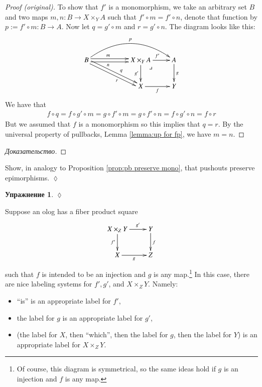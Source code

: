\documentclass[a4paper]{book}
\makeatletter
\def\to{\rightarrow}
\def\taking{\colon}
\def\ullimit{\ar@{}[rd]|(.3)*+{\lrcorner}}
\theoremstyle{myth}
\newtheorem{exampleENG}[envENG]{\begin{english}Example\end{english}}
\newtheorem{excENG}[envENG]{\begin{english}Exercise\end{english}}
\newenvironment{proofENG}{\begin{proof}[Proof (original)]}{\end{proof}}
\newenvironment{exerciseENG}{\begin{excENG}}{\hspace*{\fill}$\lozenge$\end{excENG}}
\newtheorem{excRUS}[envRUS]{Упражнение}
\newenvironment{proofRUS}{\begin{proof}[Доказательство]}{\end{proof}}
\newenvironment{exerciseRUS}{\begin{excRUS}}{\hspace*{\fill}$\lozenge$\end{excRUS}}
\makeatother
\begin{document}
\begin{russian}
\begin{proofENG}
To show that $f'$ is a monomorphism, we take an arbitrary set $B$ and two maps $m,n\taking B\to X\times_YA$ such that $f'\circ m=f'\circ n$, denote that function by $p:=f'\circ m\taking B\to A$. Now let $q=g'\circ m$ and $r=g'\circ n$. The diagram looks like this:
$$
\xymatrix{B\ar@<.5ex>[rr]^(.4)m\ar@<-.5ex>[rr]_(.4)n\ar@/^2pc/[rrr]^p\ar@<.5ex>[drr]^(.6)q\ar@<-.5ex>[drr]_(.6)r&&X\times_YA\ar[r]^{f'}\ar[d]_{g'}\ullimit&A\ar[d]^g\\&&X\ar[r]_f&Y}
$$
We have that 
\begin{align*}f\circ q=f\circ g'\circ m=g\circ f'\circ m=g\circ f'\circ n=f\circ g'\circ n=f\circ r\end{align*} 
But we assumed that $f$ is a monomorphism so this implies that $q=r$. By the universal property of pullbacks, Lemma \ref{lemma:up for fp}, we have $m=n$.
\end{proofENG}

\begin{proofRUS}
 
\end{proofRUS}

\begin{exerciseENG}
Show, in analogy to Proposition \ref{prop:pb preserve mono}, that pushouts preserve epimorphisms.
\end{exerciseENG}

\begin{exerciseRUS}
 
\end{exerciseRUS}

\begin{exampleENG}\label{exc:olog pullbacks}
Suppose an olog has a fiber product square
$$\xymatrix{X\times_ZY\ar[r]^-{g'}\ar[d]_{f'}&Y\ar[d]^f\\X\ar[r]_g&Z}$$ such that $f$ is intended to be an injection and $g$ is any map.\footnote{Of course, this diagram is symmetrical, so the same ideas hold if $g$ is an injection and $f$ is any map.} 
In this case, there are nice labeling systems for $f', g'$, and $X\times_ZY$. Namely:
\begin{itemize}
\item “is” is an appropriate label for $f'$, 
\item the label for $g$ is an appropriate label for $g'$,
\item (the label for $X$, then “which”, then the label for $g$, then the label for $Y$) is an appropriate label for $X\times_ZY$.
\end{itemize}


\end{exampleENG}
\end{russian}
\end{document}
